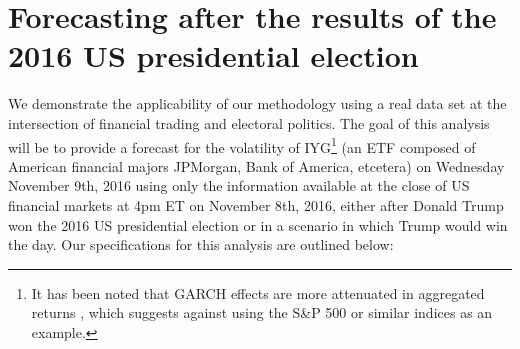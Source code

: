 \documentclass[11pt,3p,review,authoryear]{elsarticle}
\theoremstyle{definition}
\begin{document}
\clearpage 

\section{Forecasting after the results of the 2016 US presidential election}\label{Real Data Example}

We demonstrate the applicability of our methodology using a real data set at the intersection of financial trading and electoral politics. The goal of this analysis will be to provide a forecast for the volatility of IYG\footnote{It has been noted that GARCH effects are more attenuated in aggregated returns \citep{zivot2009practical}, which suggests against using the S\&P 500 or similar indices as an example.} (an ETF composed of American financial majors JPMorgan, Bank of America, etcetera) on Wednesday November 9th, 2016 using only the information available at the close of US financial markets at 4pm ET on November 8th, 2016, either after Donald Trump won the 2016 US presidential election or in a scenario in which Trump would win the day. Our specifications for this analysis are outlined below:


\end{document}
